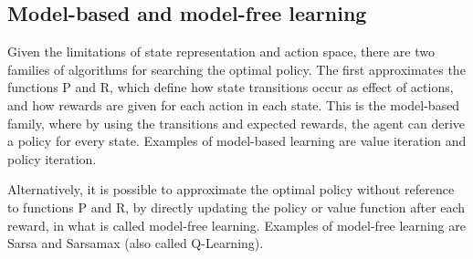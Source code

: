 \subsection{Model-based and model-free learning}
    Given the limitations of state representation and action space, there are two families of algorithms for searching the optimal policy. The first approximates the functions P and R, which define how state transitions occur as effect of actions, and how rewards are given for each action in each state. This is the model-based family, where by using the transitions and expected rewards, the agent can derive a policy for every state. Examples of model-based learning are value iteration and policy iteration.
    
    Alternatively, it is possible to approximate the optimal policy without reference to functions P and R, by directly updating the policy or value function after each reward, in what is called model-free learning. Examples of model-free learning are Sarsa and Sarsamax (also called Q-Learning). 


    